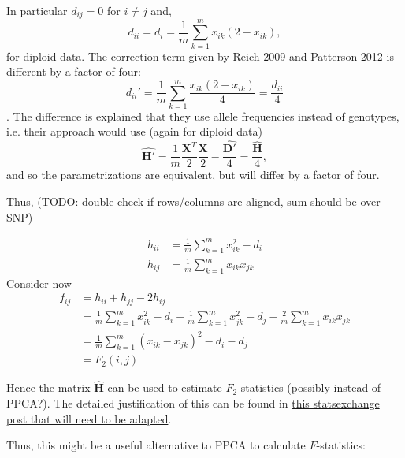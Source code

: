 \documentclass[12pt, letterpaper]{article}
\begin{document}
In particular $d_{ij} = 0 $ for $i \neq j$ and, 
\begin{equation}
    d_{ii} = d_i = \frac{1}{m}\sum_{k=1}^m x_{ik}(2-x_{ik}),
\end{equation}
for diploid data. The correction term given by Reich 2009 and Patterson 2012 is different by a factor of four:
\begin{equation*}
    d_{ii}' = \frac{1}{m}\sum_{k=1}^m \frac{x_{ik}(2-x_{ik})}{4} = \frac{d_{ii}}{4}
\end{equation*}.
The difference is explained that they use allele frequencies instead of genotypes, i.e. their approach would use (again for diploid data)
\begin{equation*}
    \hat{\mathbf{H}'} = \frac{1}{m}\frac{\mathbf{X}^T}{2}\frac{\mathbf{X}}{2} - \frac{\hat{\mathbf{D'}}}{4} = \frac{\hat{\mathbf{H}}}{4},
\end{equation*}
and so the parametrizations are equivalent, but will differ by a factor of four.

Thus, (TODO: double-check if rows/columns are aligned, sum should be over SNP)

\begin{subequations}\begin{align}
    h_{ii} &= \frac{1}{m}\sum_{k=1}^m x_{ik}^2 - d_i \\
    h_{ij} &= \frac{1}{m}\sum_{k=1}^m x_{ik}x_{jk} 
\end{align}\end{subequations}
Consider now
\begin{align}
    f_{ij} &= h_{ii} + h_{jj} - 2 h_{ij}\nonumber\\
     &= \frac{1}{m}\sum_{k=1}^m x_{ik}^2 - d_i + \frac{1}{m}\sum_{k=1}^m x_{jk}^2 - d_j - \frac{2}{m}\sum_{k=1}^m x_{ik}x_{jk}\nonumber \\
    &= \frac{1}{m} \sum_{k=1}^m (x_{ik} - x_{jk})^2 - d_i - d_j \\
    &= F_2(i,j)\nonumber
\end{align}

Hence the matrix $\hat{\mathbf{H}}$ can be used to estimate $F_2$-statistics (possibly instead of PPCA?).
The detailed justification of this can be found in \href{https://stats.stackexchange.com/questions/14002/whats-the-difference-between-principal-component-analysis-and-multidimensional}{this statsexchange post  that will need to be adapted}.

Thus, this might be a useful alternative to PPCA to calculate $F$-statistics:
\end{document}
